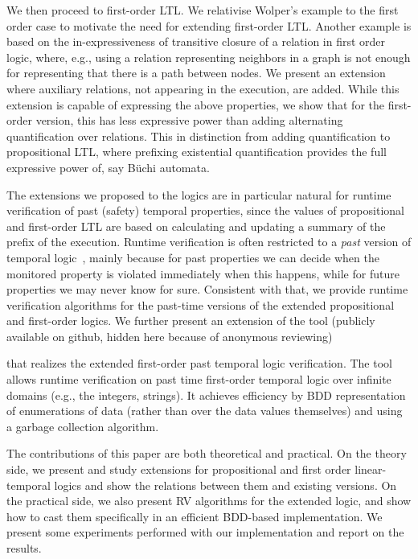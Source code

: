 We then proceed to first-order LTL. We relativise Wolper's example to the first
order case to motivate the need for
extending first-order LTL. Another example is based on the in-expressiveness of transitive closure of a relation in first order logic, where, e.g., using a relation representing neighbors in a graph is not enough for representing that there is a path between nodes.
We present an extension where auxiliary relations, not appearing in the execution, are
added. While this extension
is capable of expressing the above
properties, we show that for the first-order version, this has less 
expressive power than adding alternating quantification over relations. This in distinction from adding quantification to propositional LTL, where prefixing existential quantification
provides the full expressive power of, say B\"{u}chi automata.

The extensions we proposed to the logics are in particular natural for
runtime verification of past (safety) temporal properties, since
the values of propositional and first-order LTL are based
on calculating and updating a summary of the prefix of the execution. Runtime verification is often restricted to a {\em past}  version of temporal logic~\cite{HR}, mainly because for past properties we can decide when the monitored property is violated immediately when this happens, while for future properties we may never know for sure. Consistent with that, 
we provide runtime verification algorithms for the past-time versions of the extended propositional and first-order
logics. We further present an extension of the 
\dejavu{} tool (publicly available on {\sf github},
hidden here because of anonymous reviewing)
 that
realizes the extended first-order past temporal logic verification. The \dejavu{} tool~\cite{HPU,HP} allows runtime verification on past time first-order temporal logic over infinite domains (e.g., the integers, strings). It achieves efficiency by BDD representation of enumerations of data (rather than over the data values themselves) and using
a garbage collection algorithm. 

The contributions of this paper are both theoretical and practical. On the theory side, we present and study extensions for propositional and first order linear-temporal logics and show the relations between them and existing versions. 
On the practical side, we also present RV algorithms for the extended logic, and 
show how to cast them specifically in an efficient BDD-based implementation. We present some experiments performed with our implementation and report on the results. 

